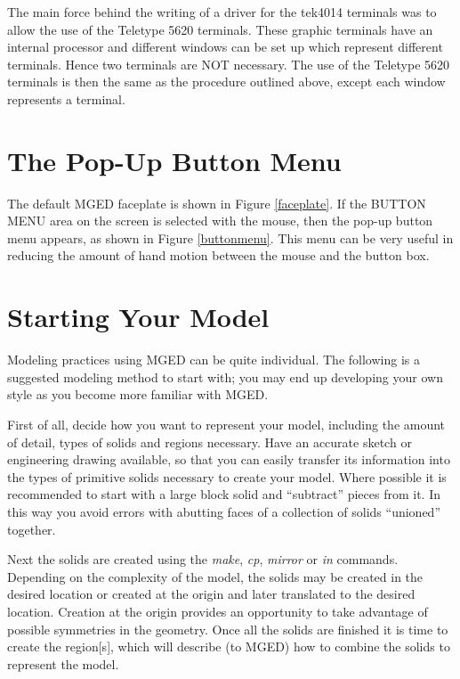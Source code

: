 The main force behind the writing of a driver for the tek4014 terminals
was to allow the use of the Teletype 5620 terminals.
These graphic terminals have an internal processor and different windows
can be set up which represent different terminals.
Hence two terminals are NOT necessary.
The use of the Teletype 5620 terminals is then the same as the procedure
outlined above, except each window represents a terminal.

\section{The Pop-Up Button Menu}

The default MGED faceplate is shown in Figure \ref{faceplate}.
If the BUTTON MENU area on the screen is selected with the mouse,
then the pop-up button menu appears, as shown in Figure \ref{buttonmenu}.
This menu can be very useful in reducing the amount of hand motion
between the mouse and the button box.

\section{Starting Your Model}

Modeling practices using MGED can be quite individual.  The following is a
suggested modeling method to start with; you may end up developing your own
style as you become more familiar with MGED.

First of all, decide how you want to represent your model, including the
amount of detail, types of solids and regions necessary.  Have an accurate
sketch or engineering drawing available, so that you can easily transfer its
information into the types of primitive solids necessary to create your model.
Where possible it is recommended to start with a large block solid and
``subtract'' pieces from it.  In this way you avoid errors with abutting
faces of a collection of solids ``unioned'' together.

Next the solids are created using the
{\em make}, {\em cp}, {\em mirror} or {\em in}
commands.  Depending on the complexity of the model, the solids may be
created in the desired location or created at the origin and later
translated to the desired location.  Creation at the origin provides
an opportunity to take advantage of possible symmetries in the geometry.
Once all the solids are finished it is time to create the region[s],
which will describe (to MGED) how to combine the solids to represent
the model.

